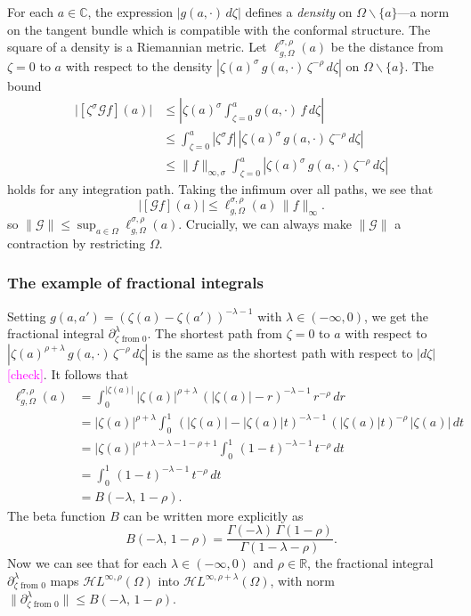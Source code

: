 \documentclass{article}
\theoremstyle{plain}
\newcommand{\R}{\mathbb{R}}
\newcommand{\C}{\mathbb{C}}
\newcommand{\holoL}[1]{\mathcal{H}L^{#1}} %
\begin{document}
For each $a \in \C$, the expression $|g(a, \cdot)\,d\zeta|$ defines a {\em density} on $\Omega \smallsetminus \{a\}$---a norm on the tangent bundle which is compatible with the conformal structure. The square of a density is a Riemannian metric. Let $\ell^{\sigma, \rho}_{g, \Omega}(a)$ be the distance from $\zeta = 0$ to $a$ with respect to the density $|\zeta(a)^\sigma\,g(a, \cdot)\,\zeta^{-\rho}\,d\zeta|$ on $\Omega \smallsetminus \{a\}$. The bound
\begin{align*}
\big|[\zeta^\sigma \mathcal{G}f](a)\big| & \le \left| \zeta(a)^\sigma \int_{\zeta = 0}^{a} g(a, \cdot)\,f\,d\zeta \right| \\
& \le \int_{\zeta = 0}^{a} |\zeta^\sigma f|\,|\zeta(a)^\sigma\,g(a, \cdot)\,\zeta^{-\rho}\,d\zeta| \\
& \le \|f\|_{\infty, \sigma} \int_{\zeta = 0}^{a} |\zeta(a)^\sigma\,g(a, \cdot)\,\zeta^{-\rho}\,d\zeta|
\end{align*}
holds for any integration path. Taking the infimum over all paths, we see that
\[ \big|[\mathcal{G}f](a)\big| \le \ell^{\sigma, \rho}_{g, \Omega}(a)\,\|f\|_\infty. \]
so $\|\mathcal{G}\| \le \sup_{a \in \Omega} \ell^{\sigma, \rho}_{g, \Omega}(a)$. Crucially, we can always make $\|\mathcal{G}\|$ a contraction by restricting $\Omega$.
\subsubsection{The example of fractional integrals}
Setting $g(a, a') = (\zeta(a) - \zeta(a'))^{-\lambda-1}$ with $\lambda \in (-\infty, 0)$, we get the fractional integral $\partial^\lambda_{\zeta \text{ from } 0}$. The shortest path from $\zeta = 0$ to $a$ with respect to $|\zeta(a)^{\rho+\lambda}\,g(a, \cdot)\,\zeta^{-\rho}\,d\zeta|$ is the same as the shortest path with respect to $|d\zeta|$ \textcolor{magenta}{[check]}. It follows that
\begin{align*}
\ell^{\sigma, \rho}_{g, \Omega}(a) & = \int_0^{|\zeta(a)|} |\zeta(a)|^{\rho+\lambda}\,(|\zeta(a)| - r)^{-\lambda-1}\,r^{-\rho}\,dr \\
& = |\zeta(a)|^{\rho+\lambda} \int_0^1 \,(|\zeta(a)| - |\zeta(a)| t)^{-\lambda-1}\,(|\zeta(a)| t)^{-\rho}\,|\zeta(a)|\,dt \\
& = |\zeta(a)|^{\rho+\lambda-\lambda-1-\rho+1} \int_0^1 \,(1-t)^{-\lambda-1}\,t^{-\rho}\,dt \\
& = \int_0^1 \,(1-t)^{-\lambda-1}\,t^{-\rho}\,dt \\
& = B(-\lambda,\,1-\rho).
\end{align*}
The beta function $B$ can be written more explicitly as
\[ B(-\lambda,\,1-\rho) = \frac{\Gamma(-\lambda)\,\Gamma(1-\rho)}{\Gamma(1-\lambda-\rho)}. \]
Now we can see that for each $\lambda \in (-\infty, 0)$ and $\rho \in \R$, the fractional integral $\partial^\lambda_{\zeta \text{ from } 0}$ maps $\holoL{\infty, \rho}(\Omega)$ into $\holoL{\infty, \rho+\lambda}(\Omega)$, with norm $\|\partial^\lambda_{\zeta \text{ from } 0}\| \le B(-\lambda,\,1-\rho)$.
\end{document}
